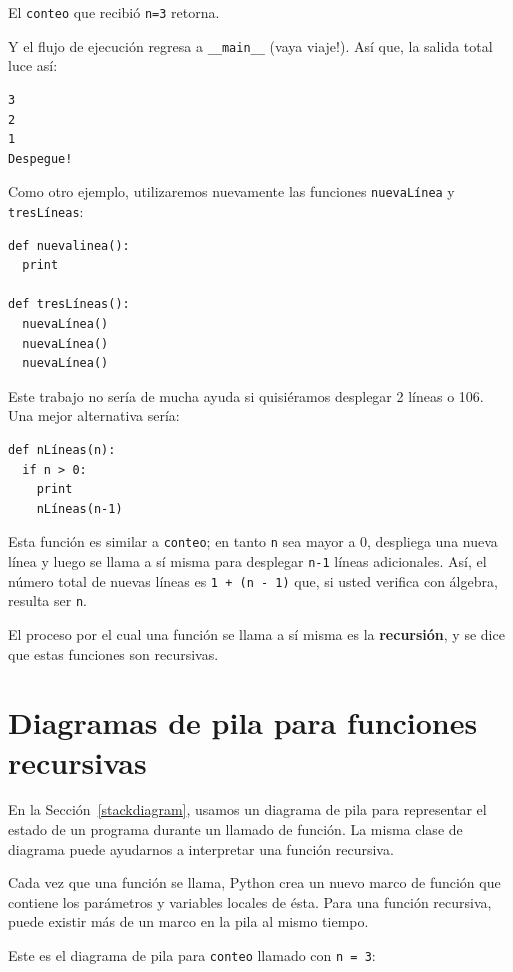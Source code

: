 El  \texttt{conteo} que recibió \texttt{n=3} retorna.

Y  el flujo de ejecución regresa a \texttt{\_\_main\_\_} (vaya viaje!).  Así que, la 
salida total luce así:

\beforeverb
\begin{verbatim}
3
2
1
Despegue!
\end{verbatim}
\afterverb
%
Como otro ejemplo, utilizaremos nuevamente las funciones \texttt{nuevaLínea} y
\texttt{tresLíneas}:

\beforeverb
\begin{verbatim}
def nuevalinea():
  print

def tresLíneas():
  nuevaLínea()
  nuevaLínea()
  nuevaLínea()
\end{verbatim}
\afterverb
%
Este trabajo no sería de mucha ayuda si quisiéramos desplegar 2 líneas o 106.
Una mejor alternativa sería:

\beforeverb
\begin{verbatim}
def nLíneas(n):
  if n > 0:
    print
    nLíneas(n-1)
\end{verbatim}
\afterverb
%
Esta función es similar a \texttt{conteo}; en tanto \texttt{n} sea 
mayor a 0, despliega una nueva línea y luego se llama a sí misma
para desplegar \texttt{n-1} líneas adicionales.  Así, el número total de
nuevas líneas es \texttt{1 + (n - 1)} que, si usted verifica con álgebra, resulta
ser \texttt{n}.

El proceso por el cual una función se llama a sí misma es la 
 {\bf recursión}, y se dice que estas funciones son recursivas.



\section{Diagramas de pila para funciones recursivas}

En la Sección~\ref{stackdiagram}, usamos un diagrama de pila para
representar el estado de un programa durante un llamado de función.
La misma clase de diagrama puede ayudarnos a interpretar una función
recursiva.

Cada vez que una función se llama, Python crea un nuevo marco de función
que contiene los parámetros y variables locales de ésta. Para una
función recursiva, puede existir más de un marco en la pila al mismo
tiempo.

Este es el diagrama de pila para \texttt{conteo} llamado con \texttt{n = 3}:

